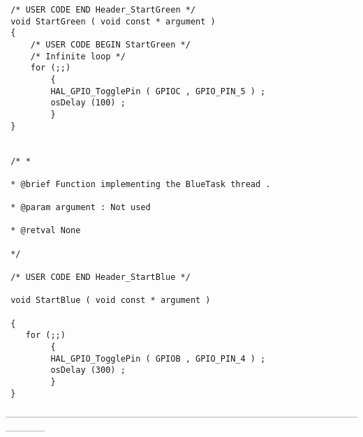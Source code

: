 \documentclass[a4paper,14pt]{extreport}
\begin{document}
\begin{verbatim}
 /* USER CODE END Header_StartGreen */
 void StartGreen ( void const * argument )
 {
     /* USER CODE BEGIN StartGreen */
     /* Infinite loop */
     for (;;)
         {
         HAL_GPIO_TogglePin ( GPIOC , GPIO_PIN_5 ) ;
         osDelay (100) ;
         }
 }
 
 
 /* *
 
 * @brief Function implementing the BlueTask thread .
 
 * @param argument : Not used
 
 * @retval None
 
 */
 
 /* USER CODE END Header_StartBlue */
 
 void StartBlue ( void const * argument )
 
 {
    for (;;)
         {
         HAL_GPIO_TogglePin ( GPIOB , GPIO_PIN_4 ) ;
         osDelay (300) ;
         } 
 }
\end{verbatim}



------------------------------------------------------------------------------------------------------------------------
\end{document}
